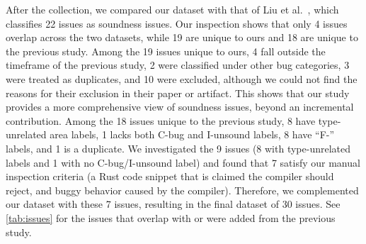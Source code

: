 
After the collection, we compared our dataset with that of Liu et
al.~\cite{liu2025empiricala}, which classifies 22 issues as soundness issues.
%
Our inspection shows that only 4 issues overlap across the two datasets, while
19 are unique to ours and 18 are unique to the previous study.
%
Among the 19 issues unique to ours, 4 fall outside the timeframe of the previous
study, 2 were classified under other bug categories, 3 were treated as
duplicates, and 10 were excluded, although we could not find the reasons for
their exclusion in their paper or artifact.
%
This shows that our study provides a more comprehensive view of soundness
issues, beyond an incremental contribution.
%
Among the 18 issues unique to the previous study, 8 have type-unrelated area
labels, 1 lacks both C-bug and I-unsound labels, 8 have ``F-'' labels, and 1 is
a duplicate.
%
We investigated the 9 issues (8 with type-unrelated labels and 1 with no
C-bug/I-unsound label) and found that 7 satisfy our manual inspection criteria
(a Rust code snippet that is claimed the compiler should reject, and buggy
behavior caused by the compiler).
%
Therefore, we complemented our dataset with these 7 issues, resulting in the
final dataset of 30 issues.
%
See \cref{tab:issues} for the issues that overlap with or were added from the
previous study.
